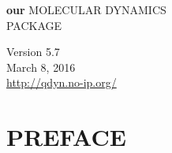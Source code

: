 \documentclass[a4paper,10pt]{article}
\newcommand{\dirfig}{./pictures}
\begin{document}
\setcaptionmargin{0.5cm} %
\thispagestyle{empty}
\begin{figure}[h]
\begin{center}
\end{center}
\end{figure}
\begin{center}
\huge{\textbf{our}} 
{\fontsize{46}{46}\selectfont M}{\fontsize{30}{30}\selectfont OLECULAR}
{\fontsize{46}{46}\selectfont D}{\fontsize{30}{30}\selectfont YNAMICS}\\
\vspace{0.2cm}
{\fontsize{30}{30}\selectfont PACKAGE}




\vspace{8.0cm}
\Huge{Version 5.7}\\
\Huge{March 8, 2016}\\
\vspace{0.8cm}
\large{\url{http://qdyn.no-ip.org/}}
\end{center}



\newpage
\tableofcontents
\newpage



\section{PREFACE}
\end{document}
